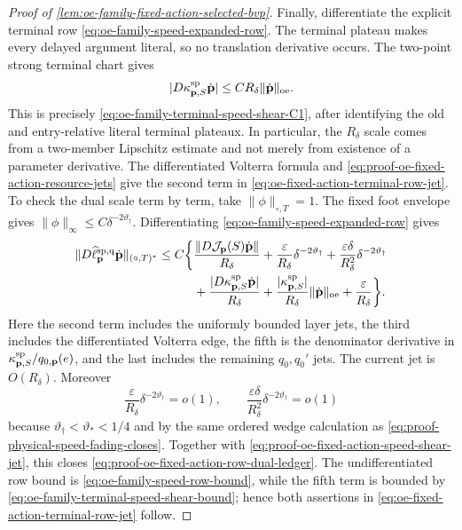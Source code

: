 \begin{proof}[Proof of
\cref{lem:oe-family-fixed-action-selected-bvp}]
Finally, differentiate the explicit terminal row
\cref{eq:oe-family-speed-expanded-row}.  The terminal plateau makes
every delayed argument literal, so no translation derivative occurs.
The two-point strong terminal chart gives
\begin{equation}
 |D\kappa_{\mathbf p,S}^{\rm sp}
              \dot{\mathbf p}|
 \le CR_\delta\|\dot{\mathbf p}\|_{\rm oe}.     \label{eq:proof-oe-fixed-action-speed-shear-jet}
\end{equation}
This is precisely
\cref{eq:oe-family-terminal-speed-shear-C1}, after identifying the old
and entry-relative literal terminal plateaux.  In particular, the
\(R_\delta\) scale comes from a two-member Lipschitz estimate and not
merely from existence of a parameter derivative.  The differentiated
Volterra formula and
\cref{eq:proof-oe-fixed-action-resource-jets} give the second term in
\cref{eq:oe-fixed-action-terminal-row-jet}.  To check the dual scale
term by term, take \(\|\phi\|_{\circ,T}=1\).  The fixed foot envelope
gives \(\|\phi\|_\infty\le
C\delta^{-2\vartheta_\dagger}\).  Differentiating
\cref{eq:oe-family-speed-expanded-row} gives
\begin{align}
 \|D\widehat\ell_{\mathbf p}^{\rm sp,q}
          \dot{\mathbf p}\|_{(\circ,T)^*}
 \le C\biggl\{&
 \frac{\|D\mathcal J_{\mathbf p}(S)
                   \dot{\mathbf p}\|}{R_\delta}
 +\frac{\varepsilon}{R_\delta}
       \delta^{-2\vartheta_\dagger}
 +\frac{\varepsilon\delta}{R_\delta^2}
       \delta^{-2\vartheta_\dagger}\notag\\
 &+\frac{|D\kappa_{\mathbf p,S}^{\rm sp}
                   \dot{\mathbf p}|}{R_\delta}
 +\frac{|\kappa_{\mathbf p,S}^{\rm sp}|}{R_\delta}
       \|\dot{\mathbf p}\|_{\rm oe}
 +\frac{\varepsilon}{R_\delta}\biggr\}.         \label{eq:proof-oe-fixed-action-row-dual-ledger}
\end{align}
Here the second term includes the uniformly bounded layer jets, the
third includes the differentiated Volterra edge, the fifth is the
denominator derivative in
\(\kappa_{\mathbf p,S}^{\rm sp}/q_{0,\mathbf p}(e)\), and the last
includes the remaining \(q_0,q_0'\) jets.  The
current jet is \(O(R_\delta)\).  Moreover
\[
 \frac{\varepsilon}{R_\delta}
       \delta^{-2\vartheta_\dagger}=o(1),\qquad
 \frac{\varepsilon\delta}{R_\delta^2}
       \delta^{-2\vartheta_\dagger}=o(1)
\]
because \(\vartheta_\dagger<\vartheta_*<1/4\) and by the same ordered
wedge calculation as
\cref{eq:proof-physical-speed-fading-closes}.  Together with
\cref{eq:proof-oe-fixed-action-speed-shear-jet}, this closes
\cref{eq:proof-oe-fixed-action-row-dual-ledger}.  The undifferentiated
row bound is
\cref{eq:oe-family-speed-row-bound}, while the fifth term is bounded by
\cref{eq:oe-family-terminal-speed-shear-bound}; hence both assertions in
\cref{eq:oe-fixed-action-terminal-row-jet} follow.
\end{proof}

